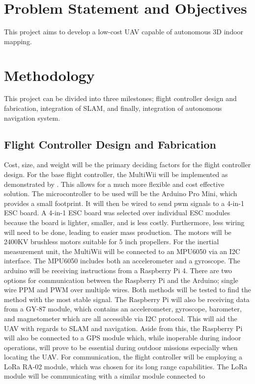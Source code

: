 \documentclass[english]{upeeei}
\begin{document}
\chapter{Problem Statement and Objectives}

This project aims to develop a low-cost UAV capable of autonomous 3D indoor mapping. 
\chapter{Methodology}
This project can be divided into three milestones; flight controller design and fabrication, integration of SLAM, and
finally, integration of autonomous navigation system.
\section{Flight Controller Design and Fabrication}
Cost, size, and weight will be the primary deciding factors for the flight controller design. For the base flight
controller, the MultiWii will be implemented as demonstrated by \cite{MultiwiiFC}. This allows for a much more flexible
and cost effective solution. The microcontroller to be used will be the Arduino Pro Mini, which provides a small
footprint. It will then be wired to send pwm signals to a 4-in-1 ESC board. A 4-in-1 ESC board was selected over
individual ESC modules because the board is lighter, smaller, and is less costly. Furthermore, less wiring will need to
be done, leading to easier mass production. The motors will be 2400KV brushless motors suitable for 5 inch propellers.
For the inertial measurement unit, the MultiWii will be connected to an MPU6050 via an I2C interface. The MPU6050 includes
both an accelerometer and a gyroscope. The arduino will be receiving instructions from a Raspberry Pi 4. There are two
options for communication between the Raspberry Pi and the Arduino; single wire PPM and PWM over multiple wires. Both
methods will be tested to find the method with the most stable signal. The Raspberry Pi will also be receiving data from
a GY-87 module, which contains an accelerometer, gyroscope, barometer, and magnetometer which are all accessible via
I2C protocol. This will aid the UAV with regards to SLAM and navigation. Aside from this, the Raspberry Pi will also be
connected to a GPS module which, while inoperable during indoor operations, will prove to be essential during outdoor
missions especially when locating the UAV. For communication, the flight controller will be employing a LoRa RA-02 module,
which was chosen for its long range capabilities. The LoRa module will be communicating with a similar module connected to
\end{document}
